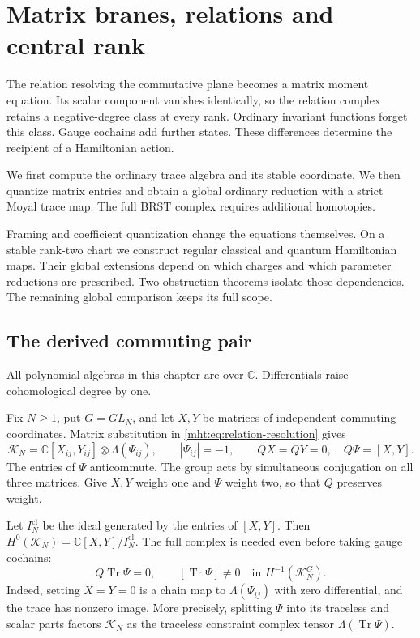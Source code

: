 \chapter{Matrix branes, relations and central rank}
\label{mht:ch:matrix-branes}

The relation resolving the commutative plane becomes a matrix
moment equation. Its scalar component vanishes identically, so
the relation complex retains a negative-degree class at every
rank. Ordinary invariant functions forget this class. Gauge
cochains add further states. These differences determine the
recipient of a Hamiltonian action.

We first compute the ordinary trace algebra and its stable
coordinate. We then quantize matrix entries and obtain a global
ordinary reduction with a strict Moyal trace map. The full BRST
complex requires additional homotopies.

Framing and coefficient
quantization change the equations themselves. On a stable rank-two
chart we construct regular classical and quantum Hamiltonian maps.
Their global extensions depend on which charges and which parameter
reductions are prescribed. Two obstruction theorems isolate those
dependencies. The remaining global comparison keeps its full scope.

\section{The derived commuting pair}

All polynomial algebras in this chapter are over $\mathbb C$.
Differentials raise cohomological degree by one.

Fix $N\geq1$,
put $G=GL_N$, and let $X,Y$ be matrices of independent commuting
coordinates. Matrix substitution in
\eqref{mht:eq:relation-resolution} gives
\begin{equation}\label{mht:eq:matrix-koszul}
 \mathcal K_N
 =\mathbb C[X_{ij},Y_{ij}]\otimes\Lambda(\Psi_{ij}),
 \qquad |\Psi_{ij}|=-1,\qquad
 QX=QY=0,\quad Q\Psi=[X,Y].
\end{equation}
The entries of $\Psi$ anticommute. The group acts by simultaneous
conjugation on all three matrices. Give $X,Y$ weight one and
$\Psi$ weight two, so that $Q$ preserves weight.

Let $I_N^{\mathrm{cl}}$ be the ideal generated by the entries of
$[X,Y]$. Then $H^0(\mathcal K_N)=\mathbb C[X,Y]/I_N^{\mathrm{cl}}$.
The full complex is needed even before taking gauge cochains:
\[
 Q\operatorname{Tr}\Psi=0,\qquad
 [\operatorname{Tr}\Psi]\ne0\quad\text{in }H^{-1}(\mathcal K_N^G).
\]
Indeed, setting $X=Y=0$ is a chain map to $\Lambda(\Psi_{ij})$
with zero differential, and the trace has nonzero image. More
precisely, splitting $\Psi$ into its traceless and scalar parts
factors $\mathcal K_N$ as the traceless constraint complex
tensor $\Lambda(\operatorname{Tr}\Psi)$.

